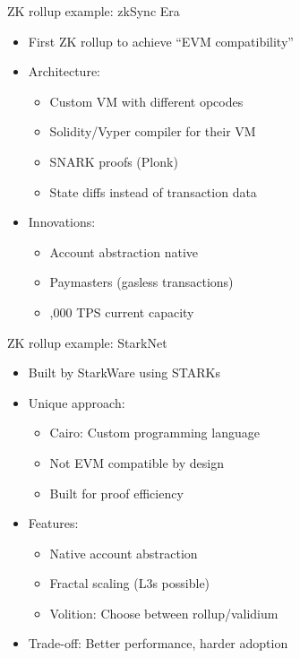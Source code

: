 \documentclass[aspectratio=169, lualatex, handout]{beamer}
\begin{document}
\begin{frame}{ZK rollup example: zkSync Era}
	\begin{itemize}
		\item First ZK rollup to achieve ``EVM compatibility''
		\item Architecture:
		      \begin{itemize}
			      \item Custom VM with different opcodes
			      \item Solidity/Vyper compiler for their VM
			      \item SNARK proofs (Plonk)
			      \item State diffs instead of transaction data
		      \end{itemize}
		\item Innovations:
		      \begin{itemize}
			      \item Account abstraction native
			      \item Paymasters (gasless transactions)
			      \item {},000 TPS current capacity
		      \end{itemize}
	\end{itemize}
\end{frame}

\begin{frame}{ZK rollup example: StarkNet}
	\begin{itemize}
		\item Built by StarkWare using STARKs
		\item Unique approach:
		      \begin{itemize}
			      \item Cairo: Custom programming language
			      \item Not EVM compatible by design
			      \item Built for proof efficiency
		      \end{itemize}
		\item Features:
		      \begin{itemize}
			      \item Native account abstraction
			      \item Fractal scaling (L3s possible)
			      \item Volition: Choose between rollup/validium
		      \end{itemize}
		\item Trade-off: Better performance, harder adoption
	\end{itemize}
\end{frame}
\end{document}
